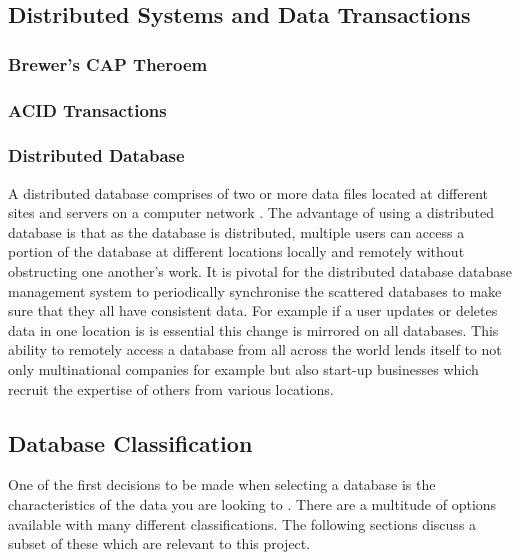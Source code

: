 \subsection{Distributed Systems and Data Transactions}\label{distrosystems}

\subsubsection{Brewer's CAP Theroem}\label{captheroem}
\subsubsection{ACID Transactions}\label{acid}
\subsubsection{Distributed Database}\label{distributeddb}
A distributed database comprises of two or more data files located at different sites and servers on a computer network \cite{dd}. The advantage of using a distributed database is that as the database is distributed, multiple users can access a portion of the database at different locations locally and remotely without obstructing one another's work. It is  pivotal for the distributed database database management system to periodically synchronise the scattered databases to make sure that they all have consistent data.  \cite{dd} For example if a user updates or deletes data in one location is is essential this change is mirrored on all databases. This ability to remotely access a database from all across the world lends itself to not only multinational companies for example but also start-up businesses which recruit the expertise of others from various locations.

\subsection{Database Classification}\label{dbclass}
One of the first decisions to be made when selecting a database is the characteristics of the data you are looking to . \cite{nosql2} There are a multitude of options available with many different classifications. The following sections discuss a subset of these which are relevant to this project.

